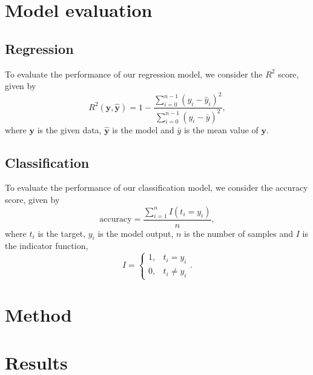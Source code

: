 \documentclass[a4paper, 11pt, twocolumn]{article}
\begin{document}
\section{Model evaluation}
\subsection{Regression}
To evaluate the performance of our regression model, we consider the $R^2$ score, given by 
\begin{equation}
    R^2(\bm{y}, \bm{\hat{y}}) = 1 - \frac{\sum_{i=0}^{n - 1} (y_i - \hat{y}_i)^2}{\sum_{i=0}^{n - 1} (y_i - \bar{y})^2},
    \label{eq:R2}
\end{equation}
where $\bm{y}$ is the given data, $\bm{\hat{y}}$ is the model and ${\bar{y}}$ is the mean value of $\bm{y}$.
\subsection{Classification}
To evaluate the performance of our classification model, we consider the accuracy score, given by 
\begin{equation}
\label{eq:accuracy}
\text{accuracy}=\frac{\sum_{i=1}^nI(t_i=y_i)}{n},
\end{equation}
where $t_i$ is the target, $y_i$ is the model output, $n$ is the number of samples and $I$ is the indicator function, 
\[
I = \begin{cases} 
1, & t_i = y_i\\
0, & t_i \neq y_i
\end{cases} .
\]

\section{Method}




\section{Results}
\end{document}
